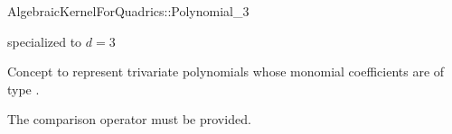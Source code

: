\begin{ccRefConcept}{AlgebraicKernelForQuadrics::Polynomial_3}

\ccRefines
{} specialized to $d = 3$

\ccDefinition

Concept to represent trivariate polynomials
whose monomial coefficients are of type 
. 



\ccOperations

The comparison operator \ccc{==} must be provided. 




\ccSeeAlso


\end{ccRefConcept}

